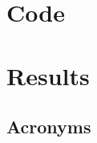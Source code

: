 \documentclass[12pt]{article}
\begin{document}



\newpage
\begin{appendices}
\section{Code}
\section{Results}

\end{appendices}

\subsection{Acronyms}
\end{document}

